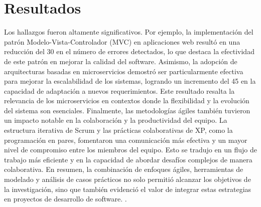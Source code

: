 \documentclass[conference]{IEEEtran}
\begin{document}
\section{Resultados}
Los hallazgos fueron altamente significativos. Por ejemplo, la implementación del patrón Modelo-Vista-Controlador (MVC) en aplicaciones web resultó en una reducción del 30 en el número de errores detectados, lo que destaca la efectividad de este patrón en mejorar la calidad del software. Asimismo, la adopción de arquitecturas basadas en microservicios demostró ser particularmente efectiva para mejorar la escalabilidad de los sistemas, logrando un incremento del 45 en la capacidad de adaptación a nuevos requerimientos. Este resultado resalta la relevancia de los microservicios en contextos donde la flexibilidad y la evolución del sistema son esenciales.
Finalmente, las metodologías ágiles también tuvieron un impacto notable en la colaboración y la productividad del equipo. La estructura iterativa de Scrum y las prácticas colaborativas de XP, como la programación en pares, fomentaron una comunicación más efectiva y un mayor nivel de compromiso entre los miembros del equipo. Esto se tradujo en un flujo de trabajo más eficiente y en la capacidad de abordar desafíos complejos de manera colaborativa. En resumen, la combinación de enfoques ágiles, herramientas de modelado y análisis de casos prácticos no solo permitió alcanzar los objetivos de la investigación, sino que también evidenció el valor de integrar estas estrategias en proyectos de desarrollo de software.
.
\end{document}
